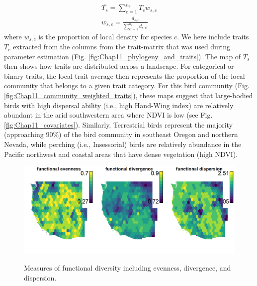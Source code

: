 \begin{equation} \label{eq:Chap11_average_traits}
\begin{gathered}
    \bar{T_s} = \sum_{c=1}^{n_c} T_c w_{s,c} \\
    w_{s,c} = \frac{d_{s,c}}{\sum_{c'=1}^{n_c} d_{s,c'}}
\end{gathered}
\end{equation}
where \(w_{s,c}\) is the proportion of local density for species \(c\).  We here include traits \(T_c\) extracted from the columns from the trait-matrix that was used during parameter estimation (Fig. \ref{fig:Chap11_phylogeny_and_traits}).  The map of \(\bar{T_s}\) then shows how traits are distributed across a landscape.  For categorical or binary traits, the local trait average then represents the proportion of the local community that belongs to a given trait category.  For this bird community (Fig. \ref{fig:Chap11_community_weighted_traits}), these maps suggest that large-bodied birds with high dispersal ability (i.e., high Hand-Wing index) are relatively abundant in the arid southwestern area where NDVI is low (see Fig. \ref{fig:Chap11_covariates}).  Similarly, Terrestrial birds represent the majority (approaching 90\%) of the bird community in southeast Oregon and northern Nevada, while perching (i.e., Insessorial) birds are relatively abundance in the Pacific northwest and coastal areas that have dense vegetation (high NDVI).  

\begin{figure}[!ht]
    \caption[Functional diversity for bird community]{Measures of functional diversity including evenness, divergence, and dispersion.}
    \includegraphics[width=5.5in]{Chap_11/functional_diversity.png}
    \label{fig:Chap11_functional_diversity}
\end{figure}

